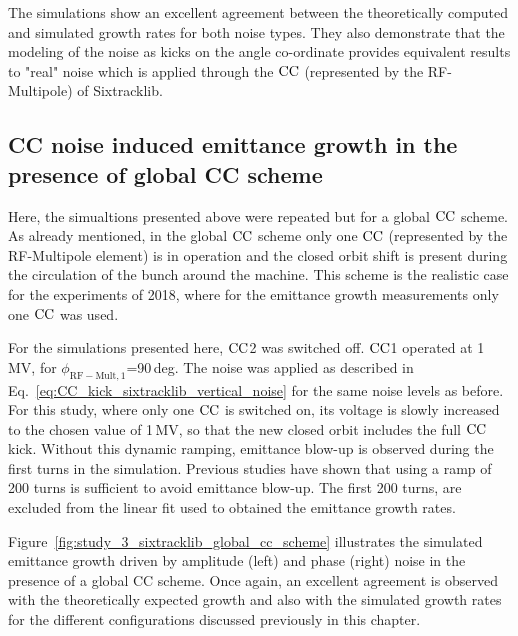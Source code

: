 The simulations show an excellent agreement between the theoretically computed and simulated growth rates for both noise types. They also demonstrate that the modeling of the noise as kicks on the angle co-ordinate provides equivalent results to "real" noise which is applied through the ${\mathrm{CC}}$ (represented by the RF-Multipole) of Sixtracklib.

\subsection{CC noise induced emittance growth in the presence of global CC scheme}\label{subsec:global_CC_sixtracklib}
Here, the simualtions presented above were repeated but for a global ${\mathrm{CC}}$ scheme. As already mentioned, in the global ${\mathrm{CC}}$ scheme only one ${\mathrm{CC}}$ (represented by the RF-Multipole element) is in operation and the closed orbit shift is present during the circulation of the bunch around the machine. This scheme is the realistic case for the experiments of 2018, where for the emittance growth measurements only one ${\mathrm{CC}}$ was used.

For the simulations presented here, ${\mathrm{CC}}$2 was switched off. ${\mathrm{CC}}$1 operated at 1\,MV, for $\phi_\mathrm{RF-Mult, 1}$=90\,deg. The noise was applied as described in Eq.~\eqref{eq:CC_kick_sixtracklib_vertical_noise} for the same noise levels as before. For this study, where only one ${\mathrm{CC}}$ is switched on, its voltage is slowly increased to the chosen value of 1\,MV, so that the new closed orbit includes the full ${\mathrm{CC}}$ kick. Without this dynamic ramping, emittance blow-up is observed during the first turns in the simulation. Previous studies have shown that using a ramp of 200 turns is sufficient to avoid emittance blow-up.
The first 200 turns, are excluded from the linear fit used to obtained the emittance growth rates. %

Figure~\ref{fig:study_3_sixtracklib_global_cc_scheme} illustrates the simulated emittance growth driven by amplitude (left) and phase (right) noise in the presence of a global CC scheme. Once again, an excellent agreement is observed with the theoretically expected growth and also with the simulated growth rates for the different configurations discussed previously in this chapter. %

